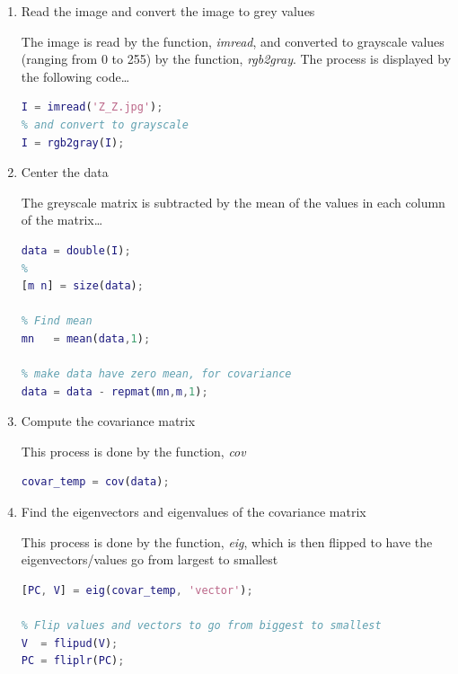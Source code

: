 \documentclass[12pt,letterpaper]{article}
\begin{document}
\begin{enumerate}
    \item Read the image and convert the image to grey values
    
    The image is read by the function, \emph{imread}, and converted to grayscale values (ranging from 0 to 255) by the function, \emph{rgb2gray}. The process is displayed by the following code\ldots
{}
\begin{lstlisting}[language = Matlab]
% Read in image
I = imread('Z_Z.jpg'); 
% and convert to grayscale
I = rgb2gray(I);
\end{lstlisting}

    \item Center the data
    
    The greyscale matrix is subtracted by the mean of the values in each column of the matrix\ldots
{}
\begin{lstlisting}[language = Matlab]
% Make data double precision
data = double(I);
%
[m n] = size(data);

% Find mean
mn   = mean(data,1);

% make data have zero mean, for covariance
data = data - repmat(mn,m,1);
\end{lstlisting}

    \item Compute the covariance matrix
    
    This process is done by the function, \emph{cov}
\begin{lstlisting}[language = Matlab]
% Find covariance of the data
covar_temp = cov(data);
\end{lstlisting}

    \item Find the eigenvectors and eigenvalues of the covariance matrix
    
    This process is done by the function, \emph{eig}, which is then flipped to have the eigenvectors/values go from largest to smallest
\begin{lstlisting}[language = Matlab]
% Find eigen values and vectors, returns eigenvalues as vector
[PC, V] = eig(covar_temp, 'vector');

% Flip values and vectors to go from biggest to smallest
V  = flipud(V);
PC = fliplr(PC);
\end{lstlisting}


\end{enumerate}
\end{document}
